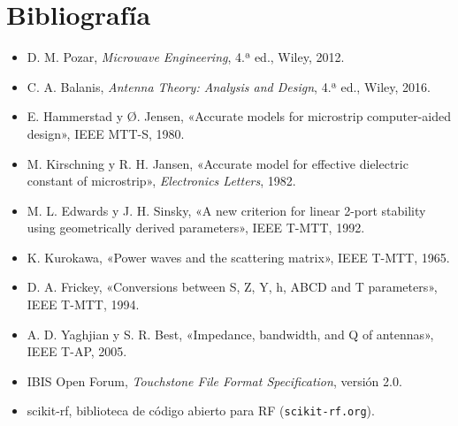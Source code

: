 \chapter{Bibliografía}
\begin{itemize}
\item D. M. Pozar, \emph{Microwave Engineering}, 4.ª ed., Wiley, 2012.
\item C. A. Balanis, \emph{Antenna Theory: Analysis and Design}, 4.ª ed., Wiley, 2016.
\item E. Hammerstad y Ø. Jensen, «Accurate models for microstrip computer-aided design», IEEE MTT-S, 1980.
\item M. Kirschning y R. H. Jansen, «Accurate model for effective dielectric constant of microstrip», \emph{Electronics Letters}, 1982.
\item M. L. Edwards y J. H. Sinsky, «A new criterion for linear 2-port stability using geometrically derived parameters», IEEE T-MTT, 1992.
\item K. Kurokawa, «Power waves and the scattering matrix», IEEE T-MTT, 1965.
\item D. A. Frickey, «Conversions between S, Z, Y, h, ABCD and T parameters», IEEE T-MTT, 1994.
\item A. D. Yaghjian y S. R. Best, «Impedance, bandwidth, and Q of antennas», IEEE T-AP, 2005.
\item IBIS Open Forum, \emph{Touchstone File Format Specification}, versión 2.0.
\item scikit-rf, biblioteca de código abierto para RF (\texttt{scikit-rf.org}).
\end{itemize}
